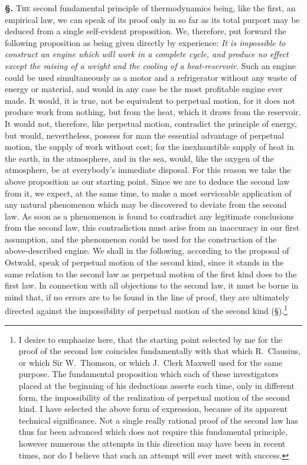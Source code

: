 \documentclass[12pt]{book}[2005/09/16]
\newcommand{\Section}[1]{
  \medskip\par\textbf{§\;#1}
  \label{section:#1}
}
\newcommand{\SecRef}[2][§\;]{\hyperref[section:#2.]{{\upshape #1#2}}}
\newcommand{\PageSep}[1]{\ignorespaces}
\newcommand{\First}[1]{\textsc{#1}}
\begin{document}
\Section{116.} \First{The} second fundamental principle of thermodynamics
being, like the first, an empirical law, we can
speak of its proof only in so far as its total purport may be
deduced from a single self-evident proposition. We, therefore,
put forward the following proposition as being given
directly by experience: \emph{It is impossible to construct an engine
which will work in a complete cycle, and produce no effect except
the raising of a weight and the cooling of a heat-reservoir.}
Such an engine could be used simultaneously as a motor
and a refrigerator without any waste of energy or material,
and would in any case be the most profitable engine ever
made. It would, it is true, not be equivalent to perpetual
motion, for it does not produce work from nothing, but from
the heat, which it draws from the reservoir. It would not,
therefore, like perpetual motion, contradict the principle of
energy, but would, nevertheless, possess for man the essential
advantage of perpetual motion, the supply of work without
cost; for the inexhaustible supply of heat in the earth, in
the atmosphere, and in the sea, would, like the oxygen
of the atmosphere, be at everybody's immediate disposal.
For this reason we take the above proposition as our starting
point. Since we are to deduce the second law from it, we
expect, at the same time, to make a most serviceable application
of any natural phenomenon which may be discovered
to deviate from the second law. As soon as a phenomenon
is found to contradict any legitimate conclusions from the
second law, this contradiction must arise from an inaccuracy
in our first assumption, and the phenomenon could be used
\PageSep{87}
for the construction of the above-described engine. We
shall in the following, according to the proposal of Ostwald,
speak of perpetual motion of the second kind, since it stands
in the same relation to the second law as perpetual motion
of the first kind does to the first law. In connection with all
objections to the second law, it must be borne in mind that,
if no errors are to be found in the line of proof, they are
ultimately directed against the impossibility of perpetual
motion of the second kind (\SecRef{136}).\footnote
  {I desire to emphasize here, that the starting point selected by me for
  the proof of the second law coincides fundamentally with that which R.~Clausius,
%
  or which Sir W.~Thomson, or which J.~Clerk Maxwell used for the
%
%
  same purpose. The fundamental proposition which each of these investigators
  placed at the beginning of his deductions asserts each time, only in
  different form, the impossibility of the realization of perpetual motion of the
  second kind. I have selected the above form of expression, because of its
  apparent technical significance. Not a single really rational proof of the
  second law has thus far been advanced which does not require this fundamental
  principle, however numerous the attempts in this direction may
  have been in recent times, nor do I believe that such an attempt will ever
  meet with success.}
\end{document}
